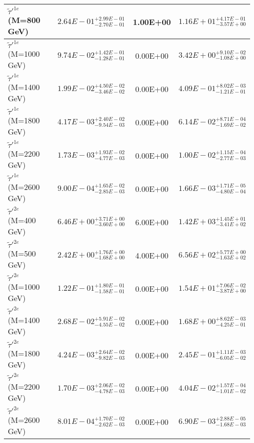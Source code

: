 \documentclass{article}
\begin{document}
\begin{center}
\begin{tabular}{ |l|c|c|c| }
 \hline
 $\tilde{\tau}'^{1e}$ (M=800 GeV) & $2.64E-01^{+2.99E-01}_{-2.70E-01}$ & 1.00E+00 & $1.16E+01^{+4.17E-01}_{-3.57E+00}$ \\
 \hline
 $\tilde{\tau}'^{1e}$ (M=1000 GeV) & $9.74E-02^{+1.42E-01}_{-1.28E-01}$ & 0.00E+00 & $3.42E+00^{+9.10E-02}_{-1.08E+00}$ \\
 \hline
 $\tilde{\tau}'^{1e}$ (M=1400 GeV) & $1.99E-02^{+4.50E-02}_{-3.46E-02}$ & 0.00E+00 & $4.09E-01^{+8.02E-03}_{-1.21E-01}$ \\
 \hline
 $\tilde{\tau}'^{1e}$ (M=1800 GeV) & $4.17E-03^{+2.40E-02}_{-9.54E-03}$ & 0.00E+00 & $6.14E-02^{+8.71E-04}_{-1.69E-02}$ \\
 \hline
 $\tilde{\tau}'^{1e}$ (M=2200 GeV) & $1.73E-03^{+1.93E-02}_{-4.77E-03}$ & 0.00E+00 & $1.00E-02^{+1.15E-04}_{-2.77E-03}$ \\
 \hline
 $\tilde{\tau}'^{1e}$ (M=2600 GeV) & $9.00E-04^{+1.65E-02}_{-2.85E-03}$ & 0.00E+00 & $1.66E-03^{+1.71E-05}_{-4.80E-04}$ \\
 \hline
 $\tilde{\tau}'^{2e}$ (M=400 GeV) & $6.46E+00^{+3.71E+00}_{-3.60E+00}$ & 6.00E+00 & $1.42E+03^{+1.45E+01}_{-3.41E+02}$ \\
 \hline
 $\tilde{\tau}'^{2e}$ (M=500 GeV) & $2.42E+00^{+1.76E+00}_{-1.68E+00}$ & 4.00E+00 & $6.56E+02^{+5.77E+00}_{-1.63E+02}$ \\
 \hline
 $\tilde{\tau}'^{2e}$ (M=1000 GeV) & $1.22E-01^{+1.80E-01}_{-1.58E-01}$ & 0.00E+00 & $1.54E+01^{+7.06E-02}_{-3.87E+00}$ \\
 \hline
 $\tilde{\tau}'^{2e}$ (M=1400 GeV) & $2.68E-02^{+5.91E-02}_{-4.55E-02}$ & 0.00E+00 & $1.68E+00^{+8.62E-03}_{-4.25E-01}$ \\
 \hline
 $\tilde{\tau}'^{2e}$ (M=1800 GeV) & $4.24E-03^{+2.64E-02}_{-9.82E-03}$ & 0.00E+00 & $2.45E-01^{+1.11E-03}_{-6.05E-02}$ \\
 \hline
 $\tilde{\tau}'^{2e}$ (M=2200 GeV) & $1.70E-03^{+2.06E-02}_{-4.78E-03}$ & 0.00E+00 & $4.04E-02^{+1.57E-04}_{-1.01E-02}$ \\
 \hline
 $\tilde{\tau}'^{2e}$ (M=2600 GeV) & $8.01E-04^{+1.70E-02}_{-2.62E-03}$ & 0.00E+00 & $6.90E-03^{+2.88E-05}_{-1.68E-03}$ \\
 \hline
 \end{tabular}
 \end{center}
 
\end{document}
